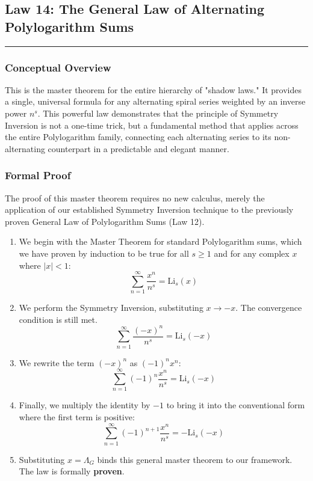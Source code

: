 \subsection*{Law 14: The General Law of Alternating Polylogarithm Sums}
\hrule
\vspace{0.3cm}
\vspace{0.5cm}

\subsubsection*{Conceptual Overview}
This is the master theorem for the entire hierarchy of "shadow laws." It provides a single, universal formula for any alternating spiral series weighted by an inverse power $n^s$. This powerful law demonstrates that the principle of Symmetry Inversion is not a one-time trick, but a fundamental method that applies across the entire Polylogarithm family, connecting each alternating series to its non-alternating counterpart in a predictable and elegant manner.

\subsubsection*{Formal Proof}
The proof of this master theorem requires no new calculus, merely the application of our established Symmetry Inversion technique to the previously proven General Law of Polylogarithm Sums (Law 12).

\begin{enumerate}
    \item We begin with the Master Theorem for standard Polylogarithm sums, which we have proven by induction to be true for all $s \ge 1$ and for any complex $x$ where $|x|<1$:
    $$ \sum_{n=1}^{\infty} \frac{x^n}{n^s} = \text{Li}_s(x) $$

    \item We perform the Symmetry Inversion, substituting $x \to -x$. The convergence condition is still met.
    $$ \sum_{n=1}^{\infty} \frac{(-x)^n}{n^s} = \text{Li}_s(-x) $$

    \item We rewrite the term $(-x)^n$ as $(-1)^n x^n$:
    $$ \sum_{n=1}^{\infty} (-1)^n \frac{x^n}{n^s} = \text{Li}_s(-x) $$
    
    \item Finally, we multiply the identity by $-1$ to bring it into the conventional form where the first term is positive:
    $$ \sum_{n=1}^{\infty} (-1)^{n+1} \frac{x^n}{n^s} = -\text{Li}_s(-x) $$

    \item Substituting $x = \Lambda_G$ binds this general master theorem to our framework. The law is formally \textbf{proven}.
\end{enumerate}

